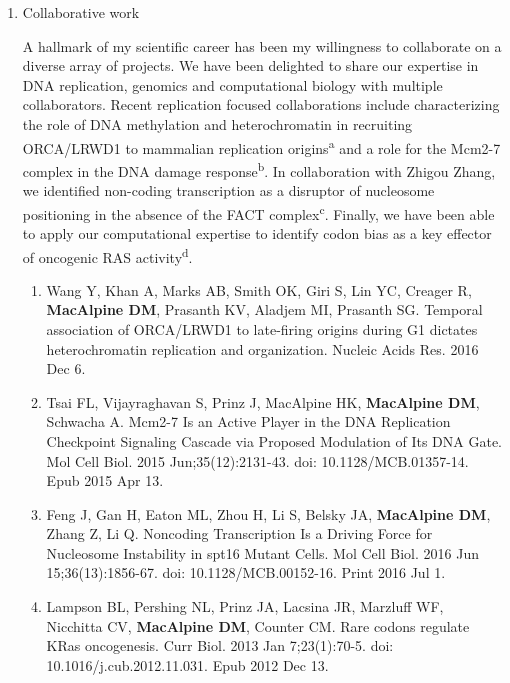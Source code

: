 \documentclass{nihbiosketch}
\begin{document}
\begin{enumerate}
\begin{enumerate}
\end{enumerate}

\item Collaborative work

\noindent A hallmark of my scientific career has been my willingness to collaborate on a diverse array of projects.  We have been delighted to share our expertise in DNA replication, genomics and computational biology with multiple collaborators.  Recent replication focused collaborations include characterizing the role of DNA methylation and heterochromatin in recruiting ORCA/LRWD1 to mammalian replication origins\textsuperscript{a} and a role for the Mcm2-7 complex in the DNA damage response\textsuperscript{b}.  In collaboration with Zhigou Zhang, we identified non-coding transcription as a disruptor of nucleosome positioning in the absence of the FACT complex\textsuperscript{c}.  Finally, we have been able to apply our computational expertise to identify codon bias as a key effector of oncogenic RAS activity\textsuperscript{d}.  



\begin{enumerate}
\setlength\itemsep{0.35em}


\item Wang Y, Khan A, Marks AB, Smith OK, Giri S, Lin YC, Creager R, \textbf{MacAlpine DM},
Prasanth KV, Aladjem MI, Prasanth SG. Temporal association of ORCA/LRWD1 to
late-firing origins during G1 dictates heterochromatin replication and
organization. Nucleic Acids Res. 2016 Dec 6. 

\item Tsai FL, Vijayraghavan S, Prinz J, MacAlpine HK, \textbf{MacAlpine DM}, Schwacha A.
Mcm2-7 Is an Active Player in the DNA Replication Checkpoint Signaling Cascade
via Proposed Modulation of Its DNA Gate. Mol Cell Biol. 2015 Jun;35(12):2131-43. 
doi: 10.1128/MCB.01357-14. Epub 2015 Apr 13. 

\item Feng J, Gan H, Eaton ML, Zhou H, Li S, Belsky JA, \textbf{MacAlpine DM}, Zhang Z, Li Q.
Noncoding Transcription Is a Driving Force for Nucleosome Instability in spt16
Mutant Cells. Mol Cell Biol. 2016 Jun 15;36(13):1856-67. doi:
10.1128/MCB.00152-16. Print 2016 Jul 1. 


\item Lampson BL, Pershing NL, Prinz JA, Lacsina JR, Marzluff WF, Nicchitta CV,
\textbf{MacAlpine DM}, Counter CM. Rare codons regulate KRas oncogenesis. Curr Biol. 2013 
Jan 7;23(1):70-5. doi: 10.1016/j.cub.2012.11.031. Epub 2012 Dec 13.

\end{enumerate}



\end{enumerate}
\end{document}
